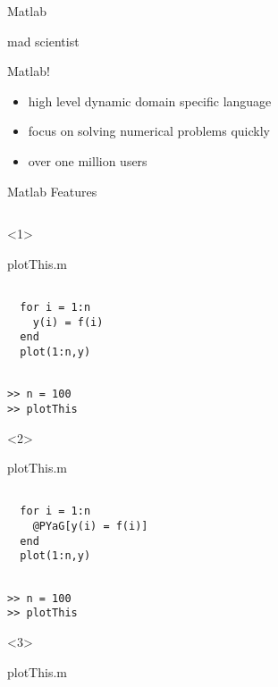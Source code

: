 
\begin{frame}{Matlab}

mad scientist

Matlab!
\begin{itemize}
\item high level dynamic domain specific language
\item focus on solving numerical problems quickly
\item over one million users
\end{itemize}

\end{frame}
\begin{frame}[fragile]{Matlab Features}
  \begin{columns}
    \begin{column}{5cm}
      \begin{onlyenv}<1>
        \begin{block}{plotThis.m}
          \begin{Verbatim}[commandchars=@\[\]]

  for i = 1:n
    y(i) = f(i)
  end
  plot(1:n,y)
          \end{Verbatim}
        \end{block}
          \begin{Verbatim}[commandchars=@\[\]]

>> n = 100
>> plotThis
        \end{Verbatim}
      \end{onlyenv}
      \begin{onlyenv}<2>
        \begin{block}{plotThis.m}
          \begin{Verbatim}[commandchars=@\[\]]

  for i = 1:n
    @PYaG[y(i) = f(i)]
  end
  plot(1:n,y)
          \end{Verbatim}
        \end{block}
          \begin{Verbatim}[commandchars=@\[\]]

>> n = 100
>> plotThis
        \end{Verbatim}
      \end{onlyenv}
      \begin{onlyenv}<3>
        \begin{block}{plotThis.m}
          \begin{Verbatim}[commandchars=@\[\]]


\end{Verbatim}
\end{block}
\end{onlyenv}
\end{column}
\end{columns}
\end{frame}
